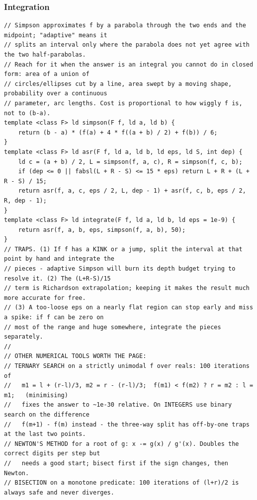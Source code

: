 \documentclass[9pt,a4paper,twocolumn]{extarticle}
\begin{document}
\filbreak
\subsubsection{Integration}
\nopagebreak
\begin{lstlisting}
// Simpson approximates f by a parabola through the two ends and the midpoint; "adaptive" means it
// splits an interval only where the parabola does not yet agree with the two half-parabolas.
// Reach for it when the answer is an integral you cannot do in closed form: area of a union of
// circles/ellipses cut by a line, area swept by a moving shape, probability over a continuous
// parameter, arc lengths. Cost is proportional to how wiggly f is, not to (b-a).
template <class F> ld simpson(F f, ld a, ld b) {
    return (b - a) * (f(a) + 4 * f((a + b) / 2) + f(b)) / 6;
}
template <class F> ld asr(F f, ld a, ld b, ld eps, ld S, int dep) {
    ld c = (a + b) / 2, L = simpson(f, a, c), R = simpson(f, c, b);
    if (dep <= 0 || fabsl(L + R - S) <= 15 * eps) return L + R + (L + R - S) / 15;
    return asr(f, a, c, eps / 2, L, dep - 1) + asr(f, c, b, eps / 2, R, dep - 1);
}
template <class F> ld integrate(F f, ld a, ld b, ld eps = 1e-9) {
    return asr(f, a, b, eps, simpson(f, a, b), 50);
}
// TRAPS. (1) If f has a KINK or a jump, split the interval at that point by hand and integrate the
// pieces - adaptive Simpson will burn its depth budget trying to resolve it. (2) The (L+R-S)/15
// term is Richardson extrapolation; keeping it makes the result much more accurate for free.
// (3) A too-loose eps on a nearly flat region can stop early and miss a spike: if f can be zero on
// most of the range and huge somewhere, integrate the pieces separately.
//
// OTHER NUMERICAL TOOLS WORTH THE PAGE:
// TERNARY SEARCH on a strictly unimodal f over reals: 100 iterations of
//   m1 = l + (r-l)/3, m2 = r - (r-l)/3;  f(m1) < f(m2) ? r = m2 : l = m1;   (minimising)
//   fixes the answer to ~1e-30 relative. On INTEGERS use binary search on the difference
//   f(m+1) - f(m) instead - the three-way split has off-by-one traps at the last two points.
// NEWTON'S METHOD for a root of g: x -= g(x) / g'(x). Doubles the correct digits per step but
//   needs a good start; bisect first if the sign changes, then Newton.
// BISECTION on a monotone predicate: 100 iterations of (l+r)/2 is always safe and never diverges.

\end{lstlisting}
\end{document}
